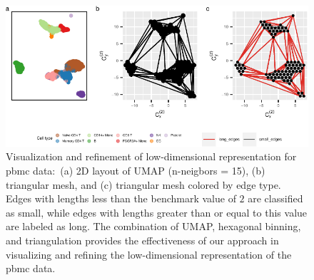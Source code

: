 \documentclass[
  12pt]{article}
\begin{document}
\begin{figure}[H]

{\centering \includegraphics[width=1\textwidth,height=\textheight]{paper_files/figure-pdf/fig-pbmc-1.pdf}

}

\caption{\label{fig-pbmc}Visualization and refinement of low-dimensional
representation for pbmc data\(\colon\) (a) 2D layout of UMAP (n-neigbors
= 15), (b) triangular mesh, and (c) triangular mesh colored by edge
type. Edges with lengths less than the benchmark value of \(2\) are
classified as small, while edges with lengths greater than or equal to
this value are labeled as long. The combination of UMAP, hexagonal
binning, and triangulation provides the effectiveness of our approach in
visualizing and refining the low-dimensional representation of the pbmc
data.}

\end{figure}
\end{document}
